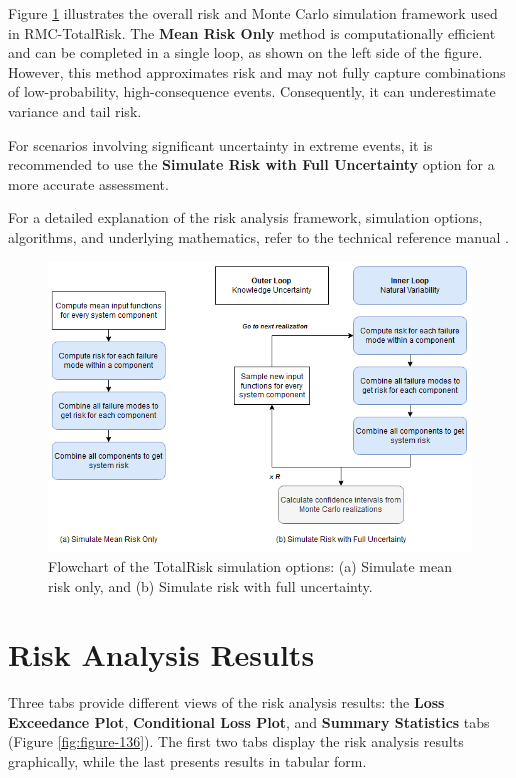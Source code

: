 \documentclass[
]{book}
\begin{document}
Figure \ref{fig:figure-risksim} illustrates the overall risk and Monte Carlo simulation framework used in RMC-TotalRisk. The \textbf{Mean Risk Only} method is computationally efficient and can be completed in a single loop, as shown on the left side of the figure. However, this method approximates risk and may not fully capture combinations of low-probability, high-consequence events. Consequently, it can underestimate variance and tail risk.

For scenarios involving significant uncertainty in extreme events, it is recommended to use the \textbf{Simulate Risk with Full Uncertainty} option for a more accurate assessment.

For a detailed explanation of the risk analysis framework, simulation options, algorithms, and underlying mathematics, refer to the technical reference manual \citep{cite-TechRef}.

\begin{figure}

{\centering \includegraphics{images/risksimulation} 

}

\caption{Flowchart of the TotalRisk simulation options: (a) Simulate mean risk only, and (b) Simulate risk with full uncertainty.}\label{fig:figure-risksim}
\end{figure}

\hypertarget{risk-analysis-results}{%
\chapter{Risk Analysis Results}\label{risk-analysis-results}}

Three tabs provide different views of the risk analysis results: the \textbf{Loss Exceedance Plot}, \textbf{Conditional Loss Plot}, and \textbf{Summary Statistics} tabs (Figure \ref{fig:figure-136}). The first two tabs display the risk analysis results graphically, while the last presents results in tabular form.
\end{document}
